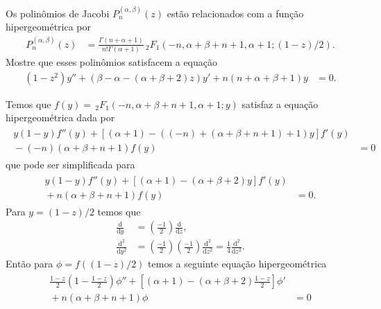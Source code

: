 \documentclass[a4paper,12pt, leqno, answers]{exam}
\begin{document}
\begin{questions}
     Os polin\^{o}mios de Jacobi $P_n^{(\alpha, \beta)}(z)$ est\~{a}o relacionados com a fun\c{c}\~{a}o hipergeom\'{e}trica por
    \begin{align*}
        P_n^{(\alpha, \beta)}(z) &= \frac{\Gamma(n + \alpha + 1)}{n! \Gamma(\alpha + 1)} \,_2F_1(-n, \alpha + \beta + n + 1, \alpha + 1; (1 - z) / 2).
    \end{align*}
    Mostre que esses polinômios satisfacem a equa\c{c}\~{a}o
    \begin{align*}
        (1 - z^2) y'' + (\beta - \alpha - (\alpha + \beta + 2)z)y' + n(n + \alpha + \beta + 1)y &= 0.
    \end{align*}
    \begin{solution}
        Temos que $f(y) = \,_2F_1(-n, \alpha + \beta + n + 1, \alpha + 1; y)$ satisfaz a equa\c{c}\~{a}o hipergeom\'{e}trica dada por
        \begin{align*}
            \begin{split}
                y (1 - y) f''(y) + \left[ (\alpha + 1) - ( (-n) + (\alpha + \beta + n + 1) + 1)y \right] f'(y) \\ {}- (-n) (\alpha + \beta + n + 1) f(y) &= 0
            \end{split}
        \end{align*}
        que pode ser simplificada para
        \begin{align*}
            \begin{split}
                y (1 - y) f''(y) + \left[ (\alpha + 1) - (\alpha + \beta + 2)y \right] f'(y) \\ {}+ n (\alpha + \beta + n + 1) f(y) &= 0.
            \end{split}
        \end{align*}
        Para $y = (1 - z)/2$ temos que
        \begin{align*}
            \frac{\mathrm{d}}{\mathrm{d}y} &= \left( \frac{-1}{2} \right) \frac{\mathrm{d}}{\mathrm{d}z}, \\
            \frac{\mathrm{d}^2}{\mathrm{d}y^2} &= \left( \frac{-1}{2} \right) \left( \frac{-1}{2} \right) \frac{\mathrm{d}^2}{\mathrm{d}z^2} = \frac{1}{4} \frac{\mathrm{d}^2}{\mathrm{d}z^2}.
        \end{align*}
        Ent\~{a}o para $\phi = f( (1 - z)/2 )$ temos a seguinte equa\c{c}\~{a}o hipergeom\'{e}trica
        \begin{align*}
            \begin{split}
                \frac{1 - z}{2} \left( 1 - \frac{1 - z}{2} \right) \phi'' + \left[ (\alpha + 1) - (\alpha + \beta + 2) \frac{1 - z}{2} \right] \phi' \\ {}+ n (\alpha + \beta + n + 1) \phi &= 0

\end{split}
\end{align*}
\end{solution}
\end{questions}
\end{document}
